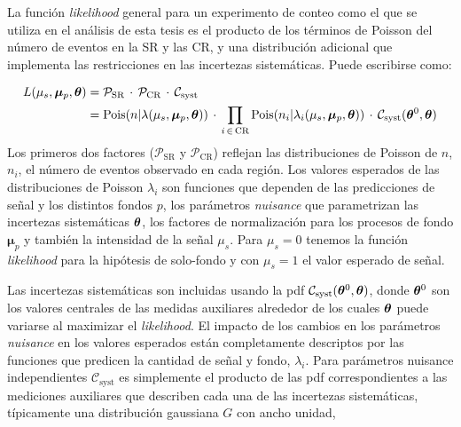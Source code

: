 

La función \emph{likelihood} general para un experimento de conteo como el que se utiliza
en el análisis de esta tesis es el producto de los términos de Poisson del
número de eventos en la SR y las CR, y una distribución adicional que implementa
las restricciones en las incertezas sistemáticas. Puede escribirse como:

\begin{align}
  L(\mu_s, \bm{\mu}_p, \bm{\theta}) &= \mathcal{P}_\text{SR} \, \cdot \, \mathcal{P}_\text{CR} \, \cdot \, \mathcal{C}_\text{syst} \nonumber \\
  &= \operatorname{Pois}(n|\lambda(\mu_s, \bm{\mu}_p, \bm{\theta})) \, \cdot \, \prod_{i \,\in\, \text{CR}} \operatorname{Pois}(n_i|\lambda_i(\mu_s, \bm{\mu}_p, \bm{\theta})) \, \cdot \, \mathcal{C}_\text{syst} (\bm{\theta}^0, \bm{\theta}) \label{eq:model}
\end{align}
%
Los primeros dos factores ($\mathcal{P}_\text{SR}$ y $\mathcal{P}_\text{CR}$)
reflejan las distribuciones de Poisson de $n$, $n_i$, el número de eventos observado
en cada región. Los valores esperados de las distribuciones de Poisson $\lambda_i$ son
funciones que dependen de las predicciones de señal y los distintos fondos $p$,
los parámetros \emph{nuisance} que parametrizan las incertezas sistemáticas $\bm{\theta}$,
los factores de normalización para los procesos de fondo $\bm{\mu}_p$ y también
la intensidad de la señal $\mu_s$. Para $\mu_s = 0$ tenemos la
función \emph{likelihood} para la hipótesis de solo-fondo y con $\mu_s = 1$ el
valor esperado de señal.

Las incertezas sistemáticas son incluidas usando la pdf
$\mathcal{C}_\text{syst}(\bm{\theta}^0, \bm{\theta})$, donde $\bm{\theta}^0$ son los valores centrales
de las medidas auxiliares alrededor de los cuales $\bm{\theta}$ puede variarse al
maximizar el \emph{likelihood}. El impacto de los cambios en los parámetros \emph{nuisance}
en los valores esperados están completamente descriptos por las funciones que
predicen la cantidad de señal y fondo, $\lambda_i$. Para parámetros nuisance
independientes $\mathcal{C}_\text{syst}$ es simplemente el producto de las pdf
correspondientes a las mediciones auxiliares que describen cada una de las
incertezas sistemáticas, típicamente una distribución gaussiana $G$ con ancho
unidad,

